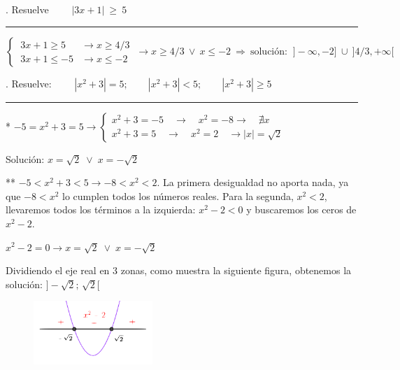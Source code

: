 \begin{miejercicio}
	. Resuelve $\qquad |3x+1| \ \geqslant \ 5$
	
\rule{250pt}{0.1pt}

\vspace{4mm} $\begin{cases} \ 3x+1\geqslant 5 &\to x\geqslant 4/3 \\ \ 3x+1\leqslant -5 &\to x\leqslant -2 \end{cases} \ \to x\geqslant 4/3 \ \vee \ x\leqslant -2 \ \Rightarrow \ \text{solución: } \ ]-\infty,-2] \ \cup \ ]4/3,+\infty[$
\end{miejercicio}


\begin{miejercicio}
	. Resuelve: $\qquad |x^2+3|=5;\qquad |x^2+3|<5; \qquad |x^2+3|\ge 5$
	
\rule{250pt}{0.1pt}
		
		
\vspace{4mm} * $-5=x^2+3=5 \to 
			\left\{ 
			\begin{matrix} 
				x^2+3=-5\quad \to \quad x^2=-8 \to \quad \nexists x\\ 
				x^2+3=5\quad \to \quad x^2=2 \quad \to |x|=\sqrt 2 
				\end{matrix} 
				\right.$  
				
\vspace{2mm} Solución: $x=\sqrt 2\; \vee \; x=-\sqrt2$
				
\vspace{4mm}  ** $-5<x^2+3<5 \to -8<x^2<2$. La primera desigualdad no aporta nada, ya que $-8<x^2$ lo cumplen todos los números reales. Para la segunda, $x^2<2$, llevaremos todos los términos a la izquierda: $x^2-2<0$ y buscaremos los ceros de 
				$x^2-2$. 

\begin{multicols}{2}				
\vspace{2mm} $x^2-2=0 \to x=\sqrt 2 \; \vee \; x=-\sqrt 2\ $ 

\vspace{2mm} Dividiendo el eje real en 3 zonas, como muestra la siguiente figura, obtenemos la solución: $]-\sqrt 2;\, \sqrt 2[$
				
			\begin{figure}[H]
			\centering
				\includegraphics[width=0.4\textwidth]{img-ecc/ecc14.png}
			\end{figure}
\end{multicols}				


\end{miejercicio}
